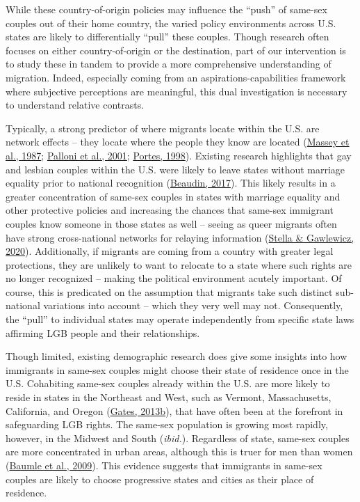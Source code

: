 \documentclass[
  11pt,
]{article}
\begin{document}
While these country-of-origin policies may influence the ``push'' of same-sex couples out of their home country, the varied policy environments across U.S. states are likely to differentially ``pull'' these couples. Though research often focuses on either country-of-origin or the destination, part of our intervention is to study these in tandem to provide a more comprehensive understanding of migration. Indeed, especially coming from an aspirations-capabilities framework where subjective perceptions are meaningful, this dual investigation is necessary to understand relative contrasts.

Typically, a strong predictor of where migrants locate within the U.S. are network effects -- they locate where the people they know are located (\protect\hyperlink{ref-massey_1987}{Massey et al., 1987}; \protect\hyperlink{ref-palloni_2001}{Palloni et al., 2001}; \protect\hyperlink{ref-portes_1998}{Portes, 1998}). Existing research highlights that gay and lesbian couples within the U.S. were likely to leave states without marriage equality prior to national recognition (\protect\hyperlink{ref-beaudin_2017}{Beaudin, 2017}). This likely results in a greater concentration of same-sex couples in states with marriage equality and other protective policies and increasing the chances that same-sex immigrant couples know someone in those states as well -- seeing as queer migrants often have strong cross-national networks for relaying information (\protect\hyperlink{ref-stella_2020}{Stella \& Gawlewicz, 2020}). Additionally, if migrants are coming from a country with greater legal protections, they are unlikely to want to relocate to a state where such rights are no longer recognized -- making the political environment acutely important. Of course, this is predicated on the assumption that migrants take such distinct sub-national variations into account -- which they very well may not. Consequently, the ``pull'' to individual states may operate independently from specific state laws affirming LGB people and their relationships.

Though limited, existing demographic research does give some insights into how immigrants in same-sex couples might choose their state of residence once in the U.S. Cohabiting same-sex couples already within the U.S. are more likely to reside in states in the Northeast and West, such as Vermont, Massachusetts, California, and Oregon (\protect\hyperlink{ref-gates_2013a}{Gates, 2013b}), that have often been at the forefront in safeguarding LGB rights. The same-sex population is growing most rapidly, however, in the Midwest and South (\emph{ibid.}). Regardless of state, same-sex couples are more concentrated in urban areas, although this is truer for men than women (\protect\hyperlink{ref-baumle_2009}{Baumle et al., 2009}). This evidence suggests that immigrants in same-sex couples are likely to choose progressive states and cities as their place of residence.
\end{document}

